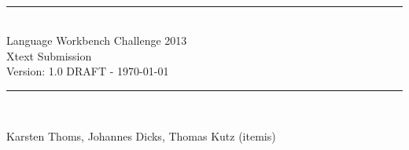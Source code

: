 \begin{titlepage}

\begin{center}

\\[3cm]


\rule{\linewidth}{0.7mm}
\\[0.4cm]


    \selectfont
    \LARGE{\color{darkblue}Language Workbench Challenge 2013 \\
    Xtext Submission} \\[0.5cm]

    \color{black}
    \large{Version: 1.0 DRAFT - \today}
    \\[0.4cm]
\rule{\linewidth}{0.7mm}
\\[1.5cm]
\normalfont

\selectfont
Karsten Thoms, Johannes Dicks, Thomas Kutz (itemis)
\normalfont

\vfill


\end{center}

\end{titlepage}  